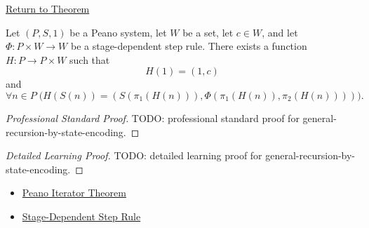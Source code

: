 \newpage
{}
\label{prf:general-recursion-by-state-encoding}

\begin{remark*}[Return]
\hyperref[thm:general-recursion-by-state-encoding]{Return to Theorem}
\end{remark*}

\begin{theorem*}
Let $(P,S,1)$ be a Peano system, let $W$ be a set, let $c\in W$, and let
$\Phi:P\times W\to W$ be a stage-dependent step rule. There exists a function
$H:P\to P\times W$ such that
\[
H(1)=(1,c)
\]
and
\[
\forall n\in P\;
\bigl(H(S(n))=(S(\pi_1(H(n))),\Phi(\pi_1(H(n)),\pi_2(H(n))))\bigr).
\]
\end{theorem*}

\begin{proof}[Professional Standard Proof]
\LRAProofBodyStart
TODO: professional standard proof for general-recursion-by-state-encoding.
\end{proof}

\begin{proof}[Detailed Learning Proof]
\LRAProofBodyStart
TODO: detailed learning proof for general-recursion-by-state-encoding.
\end{proof}

\begin{remark*}
\end{remark*}

\begin{dependencies}
\begin{itemize}
  \item \hyperref[thm:peano-iterator-theorem]{Peano Iterator Theorem}
  \item \hyperref[def:stage-dependent-step-rule]{Stage-Dependent Step Rule}
\end{itemize}
\end{dependencies}

\clearpage
